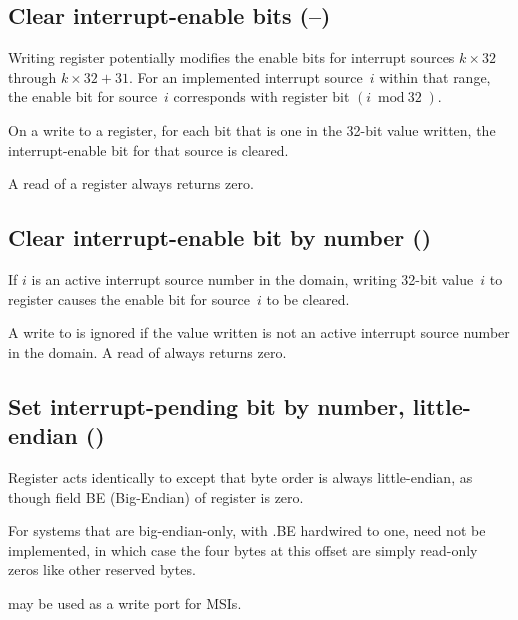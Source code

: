 \subsection{%
Clear interrupt-enable bits (--)%
}

Writing register  potentially modifies the
enable bits for interrupt sources $k\times\mbox{32}$ through
${k\times\mbox{32}+\mbox{31}}$.
For an implemented interrupt source~$i$ within that range, the enable
bit for source~$i$ corresponds with register bit ${(i\bmod\mbox{32})}$.

On a write to a  register, for each bit that is one in the
\mbox{32-bit} value written, the interrupt-enable bit for that source
is cleared.

A read of a  register always returns zero.

\subsection{Clear interrupt-enable bit by number ()}

If $i$ is an active interrupt source number in the domain, writing
\mbox{32-bit} value~$i$ to register  causes the enable bit
for source~$i$ to be cleared.

A write to  is ignored if the value written is not an
active interrupt source number in the domain.
A read of  always returns zero.

\subsection{%
Set interrupt-pending bit by number, little-endian ()%
}

Register  acts identically to  except that
byte order is always little-endian, as though field BE (Big-Endian) of
register  is zero.

For systems that are big-endian-only, with .BE hardwired
to one,  need not be implemented, in which case
the four bytes at this offset are simply read-only zeros like other
reserved bytes.

 may be used as a write port for MSIs.


